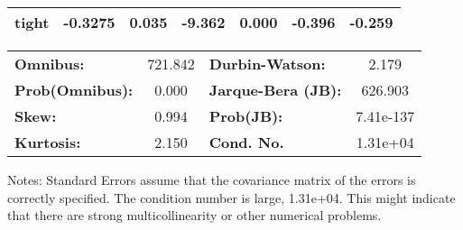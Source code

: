 \begin{center}
\begin{tabular}{lcccccc}
\textbf{tight}                    &      -0.3275  &        0.035     &    -9.362  &         0.000        &       -0.396    &       -0.259     \\
\bottomrule
\end{tabular}
\begin{tabular}{lclc}
\textbf{Omnibus:}       & 721.842 & \textbf{  Durbin-Watson:     } &     2.179  \\
\textbf{Prob(Omnibus):} &   0.000 & \textbf{  Jarque-Bera (JB):  } &   626.903  \\
\textbf{Skew:}          &   0.994 & \textbf{  Prob(JB):          } & 7.41e-137  \\
\textbf{Kurtosis:}      &   2.150 & \textbf{  Cond. No.          } &  1.31e+04  \\
\bottomrule
\end{tabular}
\end{center}

Notes: \newline
 [1] Standard Errors assume that the covariance matrix of the errors is correctly specified. \newline
 [2] The condition number is large, 1.31e+04. This might indicate that there are \newline
 strong multicollinearity or other numerical problems.